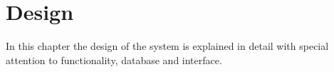 \chapter{Design}

In this chapter the design of the system is explained in detail with special attention to functionality, database and interface.
\clearpage









